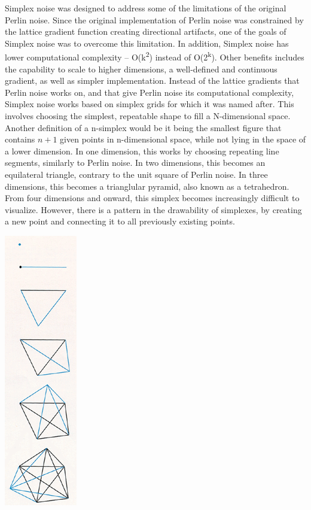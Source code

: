 \documentclass[10pt]{report}
\begin{document}
		Simplex noise was designed to address some of the limitations of the original Perlin noise. Since the original implementation of Perlin noise was constrained by the lattice gradient function creating directional artifacts, one of the goals of Simplex noise was to overcome this limitation. In addition, Simplex noise has lower computational complexity -- O(k\textsuperscript{2}) instead of O(2\textsuperscript{k})\cite{sheet-simplex}. Other benefits includes the capability to scale to higher dimensions, a well-defined and continuous gradient, as well as simpler implementation. Instead of the lattice gradients that Perlin noise works on, and that give Perlin noise its computational complexity, Simplex noise works based on simplex grids for which it was named after. This involves choosing the simplest, repeatable shape to fill a N-dimensional space. Another definition of a n-simplex would be it being the smallest figure that contains \(n+1\) given points in n-dimensional space, while not lying in the space of a lower dimension. In one dimension, this works by choosing repeating line segments, similarly to Perlin noise. In two dimensions, this becomes an equilateral triangle, contrary to the unit square of Perlin noise. In three dimensions, this becomes a trianglular pyramid, also known as a tetrahedron. From four dimensions and onward, this simplex becomes increasingly difficult to visualize. However, there is a pattern in the drawability of simplexes, by creating a new point and connecting it to all previously existing points.
		
		\begin{minipage}{\textwidth}
			\centering
			\includegraphics[scale=.75]{six simplexes}
			\label{fig:fig2}
		\end{minipage}
		
\end{document}
